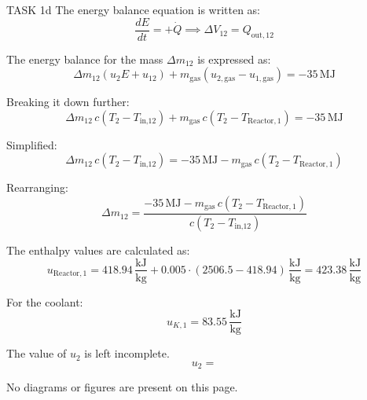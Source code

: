 TASK 1d  
The energy balance equation is written as:  
\[
\frac{dE}{dt} = + \dot{Q} \implies \Delta V_{12} = Q_{\text{out},12}
\]

The energy balance for the mass \(\Delta m_{12}\) is expressed as:  
\[
\Delta m_{12} \left( u_2 E + u_{12} \right) + m_{\text{gas}} \left( u_{2,\text{gas}} - u_{1,\text{gas}} \right) = -35 \, \text{MJ}
\]

Breaking it down further:  
\[
\Delta m_{12} \, c \left( T_2 - T_{\text{in,12}} \right) + m_{\text{gas}} \, c \left( T_2 - T_{\text{Reactor},1} \right) = -35 \, \text{MJ}
\]

Simplified:  
\[
\Delta m_{12} \, c \left( T_2 - T_{\text{in,12}} \right) = -35 \, \text{MJ} - m_{\text{gas}} \, c \left( T_2 - T_{\text{Reactor},1} \right)
\]

Rearranging:  
\[
\Delta m_{12} = \frac{-35 \, \text{MJ} - m_{\text{gas}} \, c \left( T_2 - T_{\text{Reactor},1} \right)}{c \left( T_2 - T_{\text{in,12}} \right)}
\]

The enthalpy values are calculated as:  
\[
u_{\text{Reactor},1} = 418.94 \, \frac{\text{kJ}}{\text{kg}} + 0.005 \cdot (2506.5 - 418.94) \, \frac{\text{kJ}}{\text{kg}} = 423.38 \, \frac{\text{kJ}}{\text{kg}}
\]

For the coolant:  
\[
u_{K,1} = 83.55 \, \frac{\text{kJ}}{\text{kg}}
\]

The value of \( u_2 \) is left incomplete.  
\[
u_2 =
\]  

No diagrams or figures are present on this page.